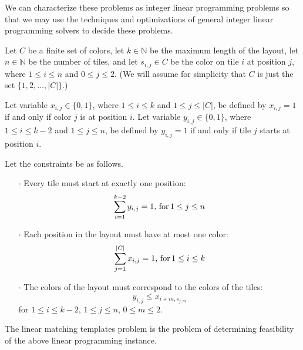 We can characterize these problems as integer linear programming problems so
that we may use the techniques and optimizations of general integer linear
programming solvers to decide these problems.

\begin{shaded}
\begin{definition}
  Let $C$ be a finite set of colors, let $k\in\mathbb{N}$ be the maximum
  length of the layout, let $n\in\mathbb{N}$ be the number of tiles, and let
  $s_{i,j}\in C$ be the color on tile $i$ at position $j$, where $1\leq i\leq
  n$ and $0\leq j\leq 2$. (We will assume for simplicity that $C$ is just the
  set $\{1, 2,\ldots, |C|\}$.)

  Let variable $x_{i,j}\in\{0, 1\}$, where $1\leq i\leq k$ and $1\leq j\leq
  |C|$, be defined by $x_{i, j} = 1$ if and only if color $j$ is at position
  $i$. Let variable $y_{i,j}\in\{0, 1\}$, where $1\leq i\leq k-2$ and $1\leq
  j\leq n$, be defined by $y_{i, j} = 1$ if and only if tile $j$ starts at
  position $i$.
    
  Let the constraints be as follows.
  \begin{itemize}
  \item[$\cdot$] Every tile must start at exactly one position:
    \begin{displaymath}
      \sum_{i = 1}^{k - 2}{y_{i, j}} = 1,\,\textnormal{for}\, 1\leq j\leq n
    \end{displaymath}
  \item[$\cdot$] Each position in the layout must have at most one color:
    \begin{displaymath}
      \sum_{j = 1}^{|C|}{x_{i, j}} = 1,\,\textnormal{for}\, 1\leq i\leq k
    \end{displaymath}
  \item[$\cdot$] The colors of the layout must correspond to the colors of
    the tiles:
    \begin{displaymath}
      y_{i, j} \leq x_{i + m, s_{j, m}}
    \end{displaymath}
    for $1\leq i\leq k - 2$, $1\leq j\leq n$, $0\leq m\leq 2$.
  \end{itemize}
    
  The linear matching templates problem is the problem of determining
  feasibility of the above linear programming instance.
\end{definition}
\end{shaded}
